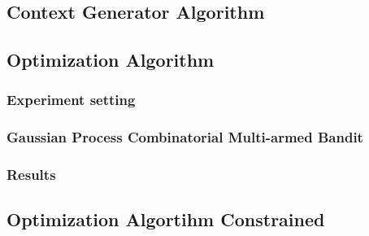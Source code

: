 \documentclass[12pt]{article}
\begin{document}
	\subsection{Context Generator Algorithm}
	
	\newpage
	\subsection{Optimization Algorithm}
	
	\subsubsection{Experiment setting}
	
	\subsubsection{Gaussian Process Combinatorial Multi-armed Bandit}
	
	\subsubsection{Results}
	
	\newpage
	\subsection{Optimization Algortihm Constrained}
	
\end{document}
